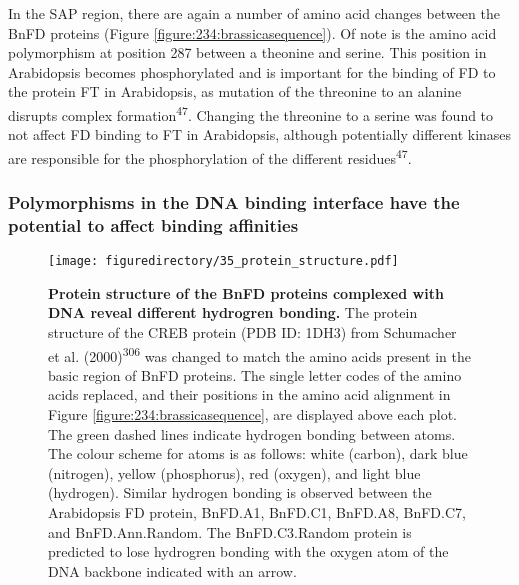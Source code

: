 \documentclass[12pt,]{book}
\begin{document}
In the SAP region, there are again a number of amino acid changes
between the BnFD proteins (Figure \ref{figure:234:brassicasequence}). Of
note is the amino acid polymorphism at position 287 between a theonine
and serine. This position in Arabidopsis becomes phosphorylated and is
important for the binding of FD to the protein FT in Arabidopsis, as
mutation of the threonine to an alanine disrupts complex
formation\textsuperscript{47}. Changing the threonine to a serine was
found to not affect FD binding to FT in Arabidopsis, although
potentially different kinases are responsible for the phosphorylation of
the different residues\textsuperscript{47}.

\subsubsection{Polymorphisms in the DNA binding interface have the
potential to affect binding
affinities}\label{section:spring:fddnabinding}

\begin{figure}[htbp]
\centering
\texttt{[image: figuredirectory/35\_protein\_structure.pdf]}
\caption{\textbf{Protein structure of the BnFD proteins complexed with
DNA reveal different hydrogren bonding.} The protein structure of the
CREB protein (PDB ID: 1DH3) from Schumacher et al.
(2000)\textsuperscript{306} was changed to match the amino acids present
in the basic region of BnFD proteins. The single letter codes of the
amino acids replaced, and their positions in the amino acid alignment in
Figure \ref{figure:234:brassicasequence}, are displayed above each plot.
The green dashed lines indicate hydrogen bonding between atoms. The
colour scheme for atoms is as follows: white (carbon), dark blue
(nitrogen), yellow (phosphorus), red (oxygen), and light blue
(hydrogen). Similar hydrogen bonding is observed between the Arabidopsis
FD protein, BnFD.A1, BnFD.C1, BnFD.A8, BnFD.C7, and BnFD.Ann.Random. The
BnFD.C3.Random protein is predicted to lose hydrogren bonding with the
oxygen atom of the DNA backbone indicated with an
arrow.}\label{figure:235:proteinstructure}
\end{figure}
\end{document}
